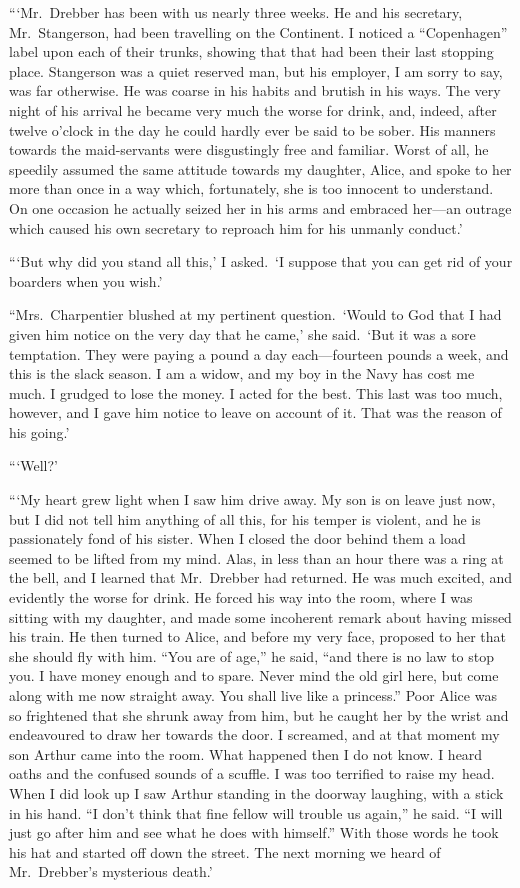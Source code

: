 \documentclass[12pt,english,oneside]{book}
\newcommand{\mdsh}[1]{\mbox{#1}\linebreak[1]}
\begin{document}
{}```Mr.\ Drebber has been with us nearly three weeks. He and his
secretary, Mr.\ Stangerson, had been travelling on the Continent.
I noticed a {}``Copenhagen'' label upon each of their trunks, showing
that that had been their last stopping place. Stangerson was a quiet
reserved man, but his employer, I am sorry to say, was far otherwise.
He was coarse in his habits and brutish in his ways. The very night
of his arrival he became very much the worse for drink, and, indeed,
after twelve o'clock in the day he could hardly ever be said to be
sober. His manners towards the maid-servants were disgustingly free
and familiar. Worst of all, he speedily assumed the same attitude
towards my daughter, Alice, and spoke to her more than once in a way
which, fortunately, she is too innocent to understand. On one occasion
he actually seized her in his arms and embraced her\mdsh{---}an outrage
which caused his own secretary to reproach him for his unmanly conduct.'

{}```But why did you stand all this,' I asked.\  `I suppose that
you can get rid of your boarders when you wish.'

{}``Mrs.\ Charpentier blushed at my pertinent question.\  `Would
to God that I had given him notice on the very day that he came,'
she said.\  `But it was a sore temptation. They were paying a pound
a day each\mdsh{---}fourteen pounds a week, and this is the slack
season. I am a widow, and my boy in the Navy has cost me much. I grudged
to lose the money. I acted for the best. This last was too much, however,
and I gave him notice to leave on account of it. That was the reason
of his going.'

{}```Well?'

{}```My heart grew light when I saw him drive away. My son is on
leave just now, but I did not tell him anything of all this, for his
temper is violent, and he is passionately fond of his sister. When
I closed the door behind them a load seemed to be lifted from my mind.
Alas, in less than an hour there was a ring at the bell, and I learned
that Mr.\ Drebber had returned. He was much excited, and evidently
the worse for drink. He forced his way into the room, where I was
sitting with my daughter, and made some incoherent remark about having
missed his train. He then turned to Alice, and before my very face,
proposed to her that she should fly with him. {}``You are of age,''
he said, {}``and there is no law to stop you. I have money enough
and to spare. Never mind the old girl here, but come along with me
now straight away. You shall live like a princess.'' Poor Alice was
so frightened that she shrunk away from him, but he caught her by
the wrist and endeavoured to draw her towards the door. I screamed,
and at that moment my son Arthur came into the room. What happened
then I do not know. I heard oaths and the confused sounds of a scuffle.
I was too terrified to raise my head. When I did look up I saw Arthur
standing in the doorway laughing, with a stick in his hand. {}``I
don't think that fine fellow will trouble us again,'' he said. {}``I
will just go after him and see what he does with himself.'' With
those words he took his hat and started off down the street. The next
morning we heard of Mr.\ Drebber's mysterious death.'
\end{document}
